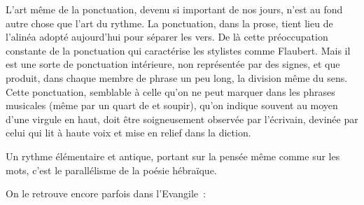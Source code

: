 \documentclass[french,twoside]{book} %
\begin{document}
L’art même de la ponctuation, devenu si important de nos jours, n’est au fond autre chose que l’art du rythme. La ponctuation, dans la prose, tient lieu de l’alinéa adopté aujourd’hui pour séparer les vers. De là cette préoccupation constante de la ponctuation qui caractérise les stylistes comme Flaubert. Mais il est une sorte de ponctuation intérieure, non représentée par des signes, et que produit, dans chaque membre de phrase un peu long, la division même du sens. Cette ponctuation, semblable à celle qu’on ne peut marquer dans les phrases musicales (même par un quart de et soupir), qu’on indique souvent au moyen d’une virgule en haut, doit être soigneusement observée par l’écrivain, devinée par celui qui lit à haute voix et mise en relief dans la diction.\par
Un rythme élémentaire et antique, portant sur la pensée même comme sur les mots, c’est le parallélisme de la poésie hébraïque.\par
On le retrouve encore parfois dans l’Evangile :\par
\end{document}
